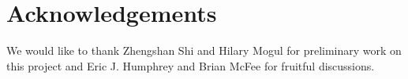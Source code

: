 \documentclass{article}
\begin{document}
\section{Acknowledgements}

We would like to thank Zhengshan Shi and Hilary Mogul for preliminary work on this project and Eric J. Humphrey and Brian McFee for fruitful discussions.


\end{document}
